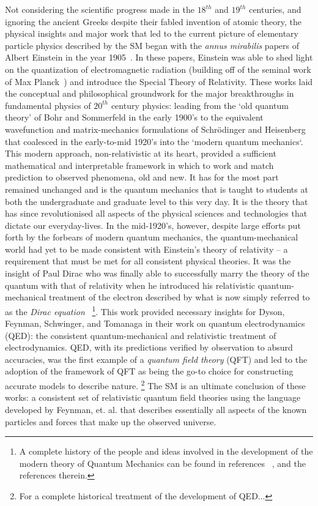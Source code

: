 Not considering the scientific progress made in the $18^{th}$ and $19^{th}$ centuries, and
ignoring the ancient Greeks despite their fabled invention of atomic theory,
the physical insights and major work that led to the current picture of elementary particle
physics described by the SM began with the \textit{annus mirabilis} papers of Albert
Einstein in the year 1905~\cite{einsteinPEE,einsteinSpecial,einsteinEnergyMass}.
In these papers, Einstein was able to shed light on the quantization of electromagnetic
radiation (building off of the seminal work of Max Planck~\cite{planckBlackBody})
and introduce the Special Theory of Relativity.
These works laid the conceptual
and philosophical groundwork for the major breakthroughs in fundamental physics
of $20^{th}$ century physics: leading from the `old quantum theory' of Bohr and Sommerfeld
in the early 1900's to the equivalent wavefunction and matrix-mechanics formulations
of Schr{\"o}dinger and Heisenberg that
coalesced in the early-to-mid 1920's into the `modern quantum mechanics`.
This modern approach, non-relativistic at its heart, provided a sufficient mathematical
and interpretable framework in which to work and match prediction to observed phenomena, old
and new. It has for the most part remained unchanged and is the quantum mechanics that is taught to
students at both the undergraduate and graduate level to this very day.
It is the theory that has since revolutionised all aspects of the physical sciences and
technologies that dictate our everyday-lives.
In the mid-1920's, however, despite
large efforts put forth by the forbears of modern quantum mechanics, the quantum-mechanical
world had yet to be made consistent with Einstein's theory of relativity -- a requirement
that must be met for all consistent physical theories.
It was the insight of Paul Dirac who was finally able to successfully
marry the theory of the quantum with that of relativity when he introduced
his relativistic quantum-mechanical treatment of the electron described by what is now
simply referred to as the \textit{Dirac equation}~\cite{diracEquation,diracPrinciples}
\footnote{
A complete history of the people and ideas involved in the development of the modern
theory of Quantum Mechanics can be found in references ~\cite{boffiRiseOfQM,historyQM},
and the references therein.
}.
This work provided necessary insights for Dyson, Feynman, Schwinger, and Tomanaga
in their work on quantum electrodynamics (QED): the consistent quantum-mechanical and
relativistic treatment of electrodynamics. QED, with its predictions verified by observation to
absurd accuracies, was the first example of a \textit{quantum field theory} (QFT) and
led to the adoption of the framework of QFT as being the go-to choice for constructing accurate
models to describe nature.
\footnote{
	For a complete historical treatment of the development of QED...
}
The SM is an ultimate conclusion of these works: a consistent set of relativistic
quantum field theories using the language developed by Feynman, et. al.
that describes essentially all aspects of the known particles and forces that make up the 
observed universe.


